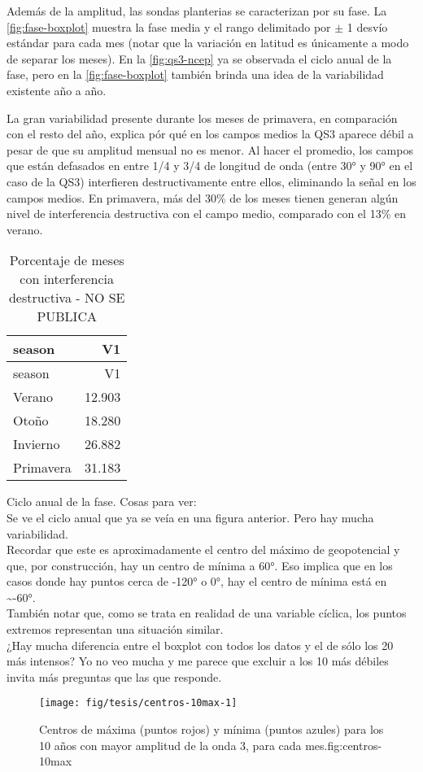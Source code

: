 \documentclass[spanish,a4paper]{book}
\begin{document}
Además de la amplitud, las sondas planterias se caracterizan por su
fase. La \autoref{fig:fase-boxplot} muestra la fase media y el rango
delimitado por \(\pm\) 1 desvío estándar para cada mes (notar que la
variación en latitud es únicamente a modo de separar los meses). En la
\autoref{fig:qs3-ncep} ya se observada el ciclo anual de la fase, pero
en la \autoref{fig:fase-boxplot} también brinda una idea de la
variabilidad existente año a año.

La gran variabilidad presente durante los meses de primavera, en
comparación con el resto del año, explica pór qué en los campos medios
la QS3 aparece débil a pesar de que su amplitud mensual no es menor. Al
hacer el promedio, los campos que están defasados en entre 1/4 y 3/4 de
longitud de onda (entre 30° y 90° en el caso de la QS3) interfieren
destructivamente entre ellos, eliminando la señal en los campos medios.
En primavera, más del 30\% de los meses tienen generan algún nivel de
interferencia destructiva con el campo medio, comparado con el 13\% en
verano.


\begin{longtable}[]{@{}lr@{}}
\caption{Porcentaje de meses con interferencia destructiva - NO SE
PUBLICA}\tabularnewline
\toprule
season & V1\tabularnewline
\midrule
\endfirsthead
\toprule
season & V1\tabularnewline
\midrule
\endhead
Verano & 12.903\tabularnewline
Otoño & 18.280\tabularnewline
Invierno & 26.882\tabularnewline
Primavera & 31.183\tabularnewline
\bottomrule
\end{longtable}

Ciclo anual de la fase. Cosas para ver:\\
Se ve el ciclo anual que ya se veía en una figura anterior. Pero hay
mucha variabilidad.\\
Recordar que este es aproximadamente el centro del máximo de
geopotencial y que, por construcción, hay un centro de mínima a 60°. Eso
implica que en los casos donde hay puntos cerca de -120° o 0°, hay el
centro de mínima está en \textasciitilde{}-60°.\\
También notar que, como se trata en realidad de una variable cíclica,
los puntos extremos representan una situación similar.\\
¿Hay mucha diferencia entre el boxplot con todos los datos y el de sólo
los 20 más intensos? Yo no veo mucha y me parece que excluir a los 10
más débiles invita más preguntas que las que responde.

\begin{figure}

{\centering \texttt{[image: fig/tesis/centros-10max-1]} 

}

\caption{Centros de máxima (puntos rojos) y mínima (puntos azules) para los 10 años con mayor amplitud de la onda 3, para cada mes.{fig:centros-10max}}\label{fig:centros-10max}
\end{figure}
\end{document}
